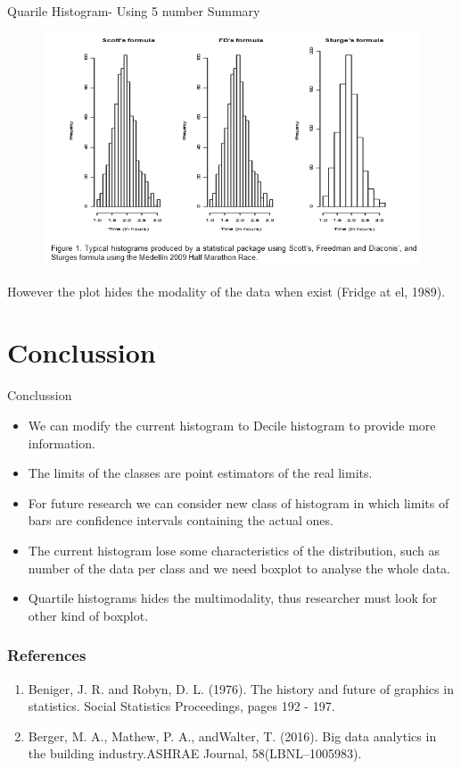 \documentclass{beamer}
\begin{document}
\begin{frame}{Quarile Histogram- Using 5 number Summary}

	\begin{figure}[t]
		\centering
       		\includegraphics[scale=0.65]{figure1}
 	\end{figure}
However the plot hides the modality of the data when exist (Fridge at el, 1989).
\end{frame}

\section{Conclussion}
\begin{frame}{Conclussion}
	\begin{itemize}
			\item We can modify the current histogram to Decile histogram to provide more information.
			\item The limits of the classes are point estimators of the real limits. 
			\item For future research we can consider new class of histogram in which limits of bars are confidence intervals containing the actual ones.
			\item The current histogram lose some characteristics of the distribution, such as number of the data per class and we need boxplot to analyse the whole data.
			\item Quartile histograms hides the multimodality, thus researcher must look for other kind of boxplot.

	\end{itemize}

\end{frame}


\begin{frame}[allowframebreaks]
\frametitle{References}
\begin{enumerate}
	\setcounter{enumi}{0}
	\item Beniger, J. R. and Robyn, D. L. (1976). The history and future of graphics in statistics. Social Statistics Proceedings, pages 192 - 197. 
	\item Berger, M. A., Mathew, P. A., andWalter, T. (2016). Big data analytics in the building industry.ASHRAE Journal, 58(LBNL–1005983).
	
\end{enumerate}
\end{frame}
\end{document}
